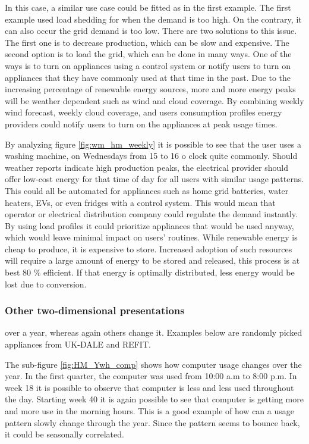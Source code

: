 In this case, a similar use case could be fitted as in the first example.
The first example used load shedding for when the demand is too high.
On the contrary, it can also occur the grid demand is too low.
There are two solutions to this issue.
The first one is to decrease production, which can be slow and expensive.
The second option is to load the grid, which can be done in many ways.
One of the ways is to turn on appliances using a control system or notify users to turn on appliances that they have commonly used at that time in the past. 
Due to the increasing percentage of renewable energy sources, more and more energy peaks will be weather dependent such as wind and cloud coverage.
By combining weekly wind forecast, weekly cloud coverage, and users consumption profiles energy providers could notify users to turn on the appliances at peak usage times.

By analyzing figure \ref{fig:wm_hm_weekly} it is possible to see that the user uses a washing machine,
on Wednesdays from  15 to 16 o clock quite commonly. 
Should weather reports indicate high production peaks, the electrical provider should offer low-cost energy for that time of day for all users with similar usage patterns. 
This could all be automated for appliances such as home grid batteries, water heaters, EVs, or even fridges with a control system.
This would mean that operator or electrical distribution company could regulate the demand instantly.
By using load profiles it could prioritize appliances that would be used anyway, which would leave minimal impact on users' routines. 
While renewable energy is cheap to produce, it is expensive to store.
Increased adoption of such resources will require a large amount of energy to be stored and released, this process is at best 80 \% efficient.
If that energy is optimally distributed, less energy would be lost due to conversion.

\subsubsection{Other two-dimensional presentations}

over a year, whereas again others change it. Examples below are randomly picked appliances
from UK-DALE and REFIT. 

The sub-figure \ref{fig:HM_Ywh_comp} shows how computer usage changes over the year.
In the first quarter, the computer was used from 10:00 a.m to 8:00 p.m.
In week 18 it is possible to observe that computer is less and less used throughout the day. 
Starting week 40 it is again possible to see that computer is getting more and more use in the morning hours. 
This is a good example of how can a usage pattern slowly change through the year. 
Since the pattern seems to bounce back, it could be seasonally correlated. 

